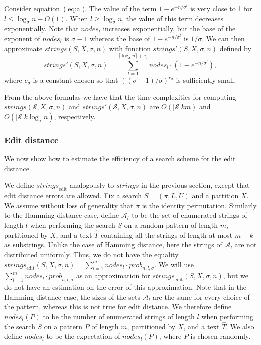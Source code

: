 \documentclass[12pt]{article}
\newcommand{\scheme}{\mathcal{S}}
\newcommand{\partition}{X}
\newcommand{\numstrings}{\mathit{strings}}
\newcommand{\numstringsp}{\numstrings'}
\newcommand{\strings}{\mathcal{A}}
\newcommand{\numnodes}[1]{\mathit{nodes}_{#1}}
\newcommand{\prob}[2]{\mathit{prob}_{#1,#2,\sigma}}
\newcommand{\numstringsedit}{\numstrings_{\mathrm{edit}}}
\newcommand{\numnodesp}[2]{\mathit{nodes}_{#1}(#2)}
\begin{document}
Consider equation~(\ref{eq:a}).
The value of the term $1-e^{-n/\sigma^{l}}$ is very close to 1
for $l \leq \log_{\sigma}n - O(1)$.
When $l \geq \log_{\sigma}n$, the value of this term decreases
exponentially.
Note that $\numnodes{l}$ increases exponentially, but the base of the exponent
of $\numnodes{l}$ is $\sigma-1$ whereas the base of $1-e^{-n/\sigma^{l}}$ is
$1/\sigma$.
We can then approximate $\numstrings(S,\partition,\sigma,n)$ with function
$\numstringsp(S,\partition,\sigma,n)$ defined by
\begin{equation}\label{eq:a2}
\numstringsp(S,\partition,\sigma,n) =
\sum_{l = 1}^{\lceil\log_{\sigma} n\rceil+c_\sigma} \numnodes{l}\cdot
 (1-e^{-n/\sigma^{l}}),
\end{equation}
where $c_\sigma$ is a constant chosen so that $((\sigma-1)/\sigma)^{c_\sigma}$
is sufficiently small.

From the above formulas we have that the time complexities for
computing $\numstrings(\scheme,\partition,\sigma,n)$ and
$\numstringsp(\scheme,\partition,\sigma,n)$ are
$O(|\scheme|km)$ and $O(|\scheme|k \log_{\sigma} n)$, respectively.


\subsubsection{Edit distance}\label{sec:estimation-edit}
We now show how to estimate the efficiency of a search scheme for the edit distance.


We define $\numstringsedit$ analogously to $\numstrings$
in the previous section, except that edit distance errors are allowed.
Fix a search $S=(\pi,L,U)$ and a partition $\partition$.
We assume without loss of generality that $\pi$ is the identity permutation.
Similarly to the Hamming distance case,
define $\strings_l$ to be the set of enumerated strings of length $l$
when performing the search $S$ on a random pattern of length $m$,
partitioned by $\partition$,
and a text $\hat{T}$ containing all the strings of length at most $m+k$ as
substrings.
Unlike the case of Hamming distance, here the strings of $\strings_l$ are not
distributed uniformly.
Thus, we do not have the equality
$\numstringsedit(S,\partition,\sigma,n) = \sum_{l=1}^{m} \numnodes{l}
\cdot \prob{n}{l}$.
We will use $\sum_{l=1}^{m} \numnodes{l} \cdot \prob{n}{l}$ as an approximation
for $\numstringsedit(S,\partition,\sigma,n)$, but we do not have an estimation
on the error of this approximation.
Note that in the Hamming distance case, the sizes of the sets $\strings_l$ are
the same for every choice of the pattern, whereas this is not true for
edit distance.
We therefore define $\numnodesp{l}{P}$ to be the number of enumerated strings
of length $l$ when performing the search $S$ on a pattern $P$ of length $m$,
partitioned by $\partition$, and a text $\hat{T}$.
We also define $\numnodes{l}$ to be the expectation of $\numnodesp{l}{P}$,
where $P$ is chosen randomly.
\end{document}
